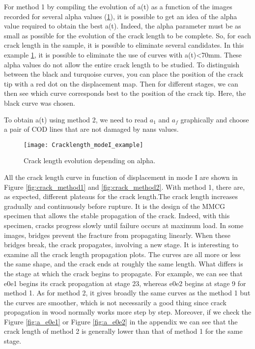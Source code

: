 For method 1 by compiling the evolution of a(t) as a function of the images recorded for several alpha values (\ref{fig:Cracklength_modeI_example}), it is possible to get an idea of the alpha value required to obtain the best a(t). Indeed, the alpha parameter must be as small as possible for the evolution of the crack length to be complete. So, for each crack length in the sample, it is possible to eliminate several candidates. In this example \ref{fig:Cracklength_modeI_example}, it is possible to eliminate the use of curves with a(t)<70mm. These alpha values do not allow the entire crack length to be studied. To distinguish between the black and turquoise curves, you can place the position of the crack tip with a red dot on the displacement map. Then for different stages, we can then see which curve corresponds best to the position of the crack tip. Here, the black curve was chosen.

To obtain a(t) using method 2, we need to read $a_1$ and $a_f$ graphically and choose a pair of COD lines that are not damaged by nans values.

\begin{figure}[H]
	\centering
	\texttt{[image: Cracklength\_modeI\_example]}
	\caption{Crack length evolution depending on alpha.}
	\label{fig:Cracklength_modeI_example}
\end{figure}

All the crack length curve in function of displacement in mode I are shown in Figure \ref{fig:crack_method1} and \ref{fig:crack_method2}.
With method 1, there are, as expected, different plateaus for the crack length.The crack length increases gradually and continuously before rupture. It is the design of the MMCG specimen that allows the stable propagation of the crack. Indeed, with this specimen, cracks progress slowly until failure occurs at maximum load. In some images, bridges prevent the fracture from propagating linearly. When these bridges break, the crack propagates, involving a new stage. It is interesting to examine all the crack length propagation plots.  The curves are all more or less the same shape, and the crack ends at roughly the same length. What differs is the stage at which the crack begins to propagate. For example, we can see that e0e1 begins its crack propagation at stage 23, whereas e0e2 begins at stage 9 for method 1.
As for method 2, it gives broadly the same curves as the method 1 but the curves are smoother, which is not necessarily a good thing since crack propagation in wood normally works more step by step. Moreover, if we check the Figure \ref{fig:a_e0e1} or Figure \ref{fig:a_e0e2} in the appendix  we can see that the crack length of method 2 is generally lower than that of method 1 for the same stage.


